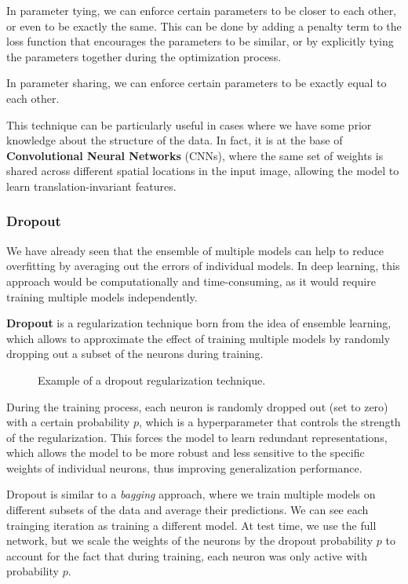 In parameter tying, we can enforce certain parameters to be closer to each other, or even to be exactly the same. 
This can be done by adding a penalty term to the loss function that encourages the parameters to be similar, or by explicitly tying the parameters together during the optimization process.

In parameter sharing, we can enforce certain parameters to be exactly equal to each other.

This technique can be particularly useful in cases where we have some prior knowledge about the structure of the data.
In fact, it is at the base of \textbf{Convolutional Neural Networks} (CNNs), where the same set of weights is shared across different spatial locations in the input image, 
allowing the model to learn translation-invariant features.


\subsubsection{Dropout}
We have already seen that the ensemble of multiple models can help to reduce overfitting by averaging out the errors of individual models.
In deep learning, this approach would be computationally and time-consuming, as it would require training multiple models independently.

\textbf{Dropout} is a regularization technique born from the idea of ensemble learning, which allows to approximate the effect of training 
multiple models by randomly dropping out a subset of the neurons during training.
\begin{figure}[H]
    \centering
    
    \caption{Example of a dropout regularization technique.}
    \label{fig:dropout}
\end{figure}
During the training process, each neuron is randomly dropped out (set to zero) with a certain probability $p$, which is a hyperparameter that controls the strength of the regularization.
This forces the model to learn redundant representations, which allows the model to be more robust and less sensitive to the specific weights of individual neurons, 
thus improving generalization performance.

Dropout is similar to a \textit{bagging} approach, where we train multiple models on different subsets of the data and average their predictions.
We can see each trainging iteration as training a different model. At test time, we use the full network, but we scale the weights of the neurons by the dropout probability $p$ to account for the fact that during training, each neuron was only active with probability $p$.
